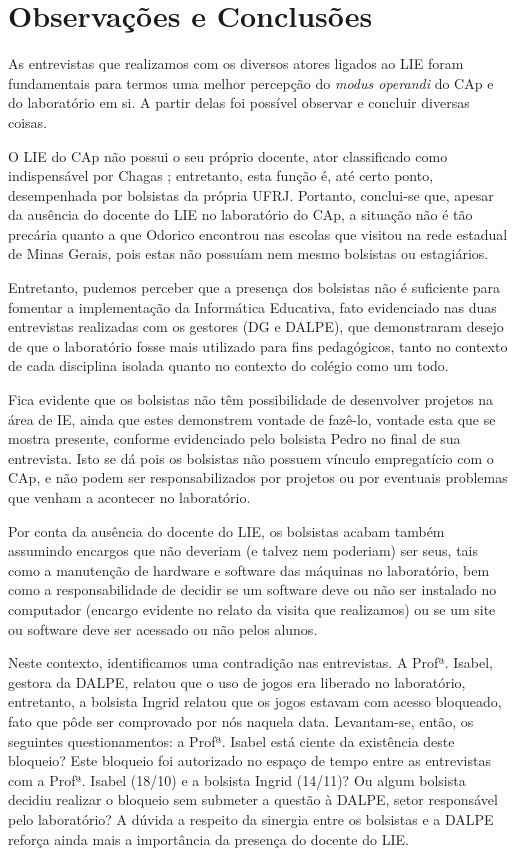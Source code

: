 \section{Observações e Conclusões}\label{chp:LABEL_CHP_ENT_OBS_CONC}

As entrevistas que realizamos com os diversos atores ligados ao LIE foram fundamentais para termos uma melhor percepção do \textit{modus operandi} do CAp e do laboratório em si. A partir delas foi possível observar e concluir diversas coisas.

O LIE do CAp não possui o seu próprio docente, ator classificado como indispensável por Chagas \cite{art:REF_ART_CHAGAS}; entretanto, esta função é, até certo ponto, desempenhada por bolsistas da própria UFRJ. Portanto, conclui-se que, apesar da ausência do docente do LIE no laboratório do CAp, a situação não é tão precária quanto a que Odorico \cite{art:REF_ART_ODORICO} encontrou nas escolas que visitou na rede estadual de Minas Gerais, pois estas não possuíam nem mesmo bolsistas ou estagiários.

Entretanto, pudemos perceber que a presença dos bolsistas não é suficiente para fomentar a implementação da Informática Educativa, fato evidenciado nas duas entrevistas realizadas com os gestores (DG e DALPE), que demonstraram desejo de que o laboratório fosse mais utilizado para fins pedagógicos, tanto no contexto de cada disciplina isolada quanto no contexto do colégio como um todo.

Fica evidente que os bolsistas não têm possibilidade de desenvolver projetos na área de IE, ainda que estes demonstrem vontade de fazê-lo, vontade esta que se mostra presente, conforme evidenciado pelo bolsista Pedro no final de sua entrevista. Isto se dá pois os bolsistas não possuem vínculo empregatício com o CAp, e não podem ser responsabilizados por projetos ou por eventuais problemas que venham a acontecer no laboratório.

Por conta da ausência do docente do LIE, os bolsistas acabam também assumindo encargos que não deveriam (e talvez nem poderiam) ser seus, tais como a manutenção de hardware e software das máquinas no laboratório, bem como a responsabilidade de decidir se um software deve ou não ser instalado no computador (encargo evidente no relato da visita que realizamos) ou se um site ou software deve ser acessado ou não pelos alunos.

Neste contexto, identificamos uma contradição nas entrevistas. A Profª. Isabel, gestora da DALPE, relatou que o uso de jogos era liberado no laboratório, entretanto, a bolsista Ingrid relatou que os jogos estavam com acesso bloqueado, fato que pôde ser comprovado por nós naquela data. Levantam-se, então, os seguintes questionamentos: a Profª. Isabel está ciente da existência deste bloqueio? Este bloqueio foi autorizado no espaço de tempo entre as entrevistas com a Profª. Isabel (18/10) e a bolsista Ingrid (14/11)? Ou algum bolsista decidiu realizar o bloqueio sem submeter a questão à DALPE, setor responsável pelo laboratório? A dúvida a respeito da sinergia entre os bolsistas e a DALPE reforça ainda mais a importância da presença do docente do LIE.

